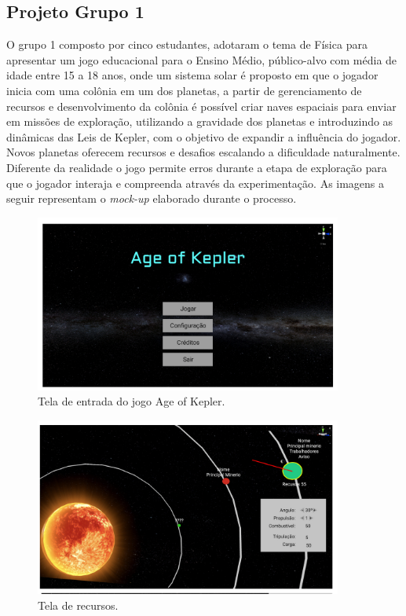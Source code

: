 \documentclass[12pt, onecolumn]{IEEEtran}
\begin{document}
\subsection{Projeto Grupo 1}

O grupo 1 composto por cinco estudantes, adotaram o tema de Física para apresentar um jogo educacional para o Ensino Médio, público-alvo com média de idade entre 15 a 18 anos, onde um sistema solar é proposto em que o jogador inicia com uma colônia em um dos planetas, a partir de gerenciamento de recursos e desenvolvimento da colônia é possível criar naves espaciais para enviar em missões de exploração, utilizando a gravidade dos planetas e introduzindo as dinâmicas das Leis de Kepler, com o objetivo de expandir a influência do jogador. Novos planetas oferecem recursos e desafios escalando a dificuldade naturalmente. Diferente da realidade o jogo permite erros durante a etapa de exploração para que o jogador interaja e compreenda através da experimentação. As imagens a seguir representam o \textit{mock-up} elaborado durante o processo.

\begin{figure}[H]
    \centering
    \includegraphics[width=0.9\textwidth]{imagens/grupo1-img1.png}
    \caption{Tela de entrada do jogo Age of Kepler.}
    \label{fig:mesh1}
\end{figure}

    \begin{figure}[H]
    \centering
    \includegraphics[width=0.9\textwidth]{imagens/grupo1-img2.png}
    \caption{Tela de recursos.}
    \label{fig:mesh1}
\end{figure}
\end{document}

